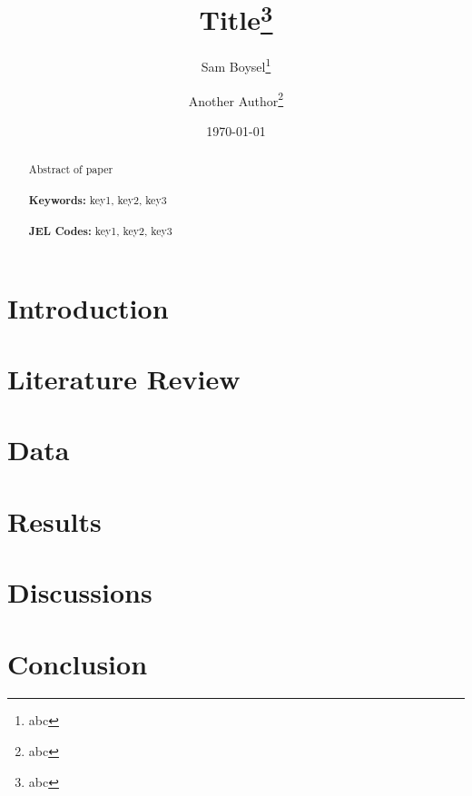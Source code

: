 \documentclass[12pt]{article}
\begin{document}
\begin{titlepage}
\title{Title\thanks{abc}}
\author{Sam Boysel\thanks{abc} \and Another Author\thanks{abc}}
\date{\today}
\maketitle
\begin{abstract}
\noindent Abstract of paper \\

\vspace{0in}\\
\noindent\textbf{Keywords:} key1, key2, key3\\
\vspace{-0.25in}\\
\noindent\textbf{JEL Codes:} key1, key2, key3\\

\bigskip
\end{abstract}
\setcounter{page}{0}
\thispagestyle{empty}
\end{titlepage}
\pagebreak \newpage

\doublespacing


\section{Introduction} \label{sec:introduction}

\section{Literature Review} \label{sec:literature}

\section{Data} \label{sec:data}

\section{Results} \label{sec:result}

\section{Discussions} \label{sec:discussion}

\section{Conclusion} \label{sec:conclusion}
\end{document}
